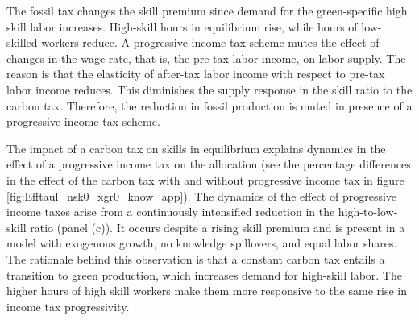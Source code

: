     The fossil tax changes the skill premium since demand for the green-specific high skill labor increases. High-skill hours in equilibrium rise, while hours of low-skilled workers reduce.  A progressive income tax scheme mutes the effect of changes in the wage rate, that is, the pre-tax labor income, on labor supply. The reason is that the elasticity of after-tax labor income with respect to pre-tax labor income reduces. This diminishes the supply response in the skill ratio to the carbon tax. Therefore, the reduction in fossil production is muted in presence of a progressive income tax scheme. 
    
    The impact of a carbon tax on skills in equilibrium explains dynamics in the effect of a progressive income tax on the allocation (see the percentage differences in the effect of the carbon tax with and without progressive income tax in figure \ref{fig:Efftaul_nsk0_xgr0_know_app}). 
    The dynamics of the effect of progressive income taxes arise from a continuously intensified reduction in the high-to-low-skill ratio (panel (c)). It occurs despite a rising skill premium and is present in a model with exogenous growth, no knowledge spillovers, and equal labor shares.
    The rationale behind this observation is that a constant carbon tax entails a transition to green production, which increases demand for high-skill labor. The higher hours of high skill workers make them more responsive to the same rise in income tax progressivity. 
    
    
    
    
   
